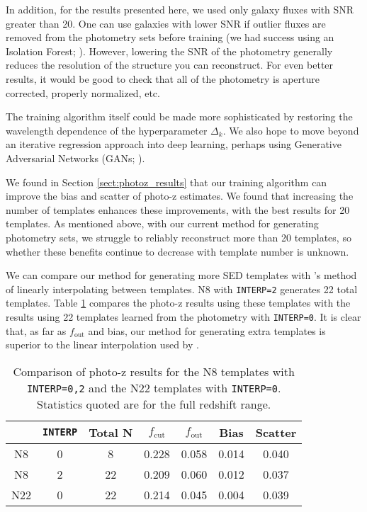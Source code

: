 In addition, for the results presented here, we used only galaxy fluxes with SNR greater than 20.
One can use galaxies with lower SNR if outlier fluxes are removed from the photometry sets before training (we had success using an Isolation Forest; \citealt{Ting2008,Liu2012}).
However, lowering the SNR of the photometry generally reduces the resolution of the structure you can reconstruct.
For even better results, it would be good to check that all of the photometry is aperture corrected, properly normalized, etc.

The training algorithm itself could be made more sophisticated by restoring the wavelength dependence of the hyperparameter $\Delta_k$.
We also hope to move beyond an iterative regression approach into deep learning, perhaps using Generative Adversarial Networks (GANs; \citealt{Goodfellow2014}).

We found in Section \ref{sect:photoz_results} that our training algorithm can improve the bias and scatter of photo-z estimates.
We found that increasing the number of templates enhances these improvements, with the best results for 20 templates.
As mentioned above, with our current method for generating photometry sets, we struggle to reliably reconstruct more than 20 templates, so whether these benefits continue to decrease with template number is unknown.

We can compare our method for generating more SED templates with \bpz's method of linearly interpolating between templates.
N8 with \texttt{INTERP=2} generates 22 total templates.
Table \ref{tab:interp_comparison} compares the photo-z results using these templates with the results using 22 templates learned from the photometry with \texttt{INTERP=0}.
It is clear that, as far as $f_\text{out}$ and bias, our method for generating extra templates is superior to the linear interpolation used by \bpz. 

\begin{table}
    \caption{Comparison of photo-z results for the N8 templates with \texttt{INTERP=0,2} and the N22 templates with \texttt{INTERP=0}. Statistics quoted are for the full redshift range.}
    \label{tab:interp_comparison}
    \centering
    \begin{tabular}{c c c c c c c}
        \hline \hline
        & \texttt{INTERP} & Total N & $f_\text{cut}$ & $f_\text{out}$ & Bias & Scatter \\
        \hline

        N8  & 0 &  8 & 0.228 & 0.058 & 0.014 & 0.040 \\
        N8  & 2 & 22 & 0.209 & 0.060 & 0.012 & 0.037 \\
        N22 & 0 & 22 & 0.214 & 0.045 & 0.004 & 0.039 \\

        \hline
    \end{tabular}
\end{table}

